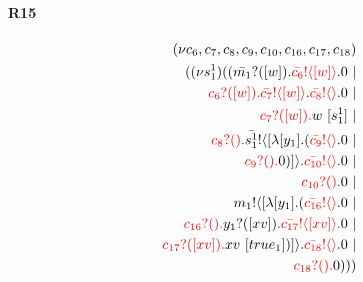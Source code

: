 \documentclass{article}
\begin{document}
\paragraph{R15}
\begin{align*}
 (\nu c_{6},c_{7},c_{8},c_{9},c_{10},c_{16},c_{17},c_{18}) \\ ( (\nu s^{1}_{1})((\color{black}\bar{m_{1}}?([w]).\color{black}\color{red}\bar{c_{6}}! \langle [w] \rangle \color{black}.0  \ | \\ \color{red}c_{6}?([w]).\color{black}\color{red}\bar{c_{7}}! \langle [w] \rangle \color{black}.\color{red}\bar{c_{8}}! \langle  \rangle \color{black}.0  \ | \\ \color{red}c_{7}?([w]).\color{black}w \ [s^{1}_{1}] \ | \\ \color{red}c_{8}?().\color{black}\color{black}\bar{s^{1}_{1}}! \langle [ \lambda [y_{1}].(\color{red}\bar{c_{9}}! \langle  \rangle \color{black}.0  \ | \\ \color{red}c_{9}?().\color{black}0 )] \rangle \color{black}.\color{red}\bar{c_{10}}! \langle  \rangle \color{black}.0  \ | \\ \color{red}c_{10}?().\color{black}0  \ | \\ \color{black}m_{1}! \langle [ \lambda [y_{1}].(\color{red}\bar{c_{16}}! \langle  \rangle \color{black}.0  \ | \\ \color{red}c_{16}?().\color{black}\color{black}y_{1}?([xv]).\color{black}\color{red}\bar{c_{17}}! \langle [xv] \rangle \color{black}.0  \ | \\ \color{red}c_{17}?([xv]).\color{black}xv \ [true_{1}])] \rangle \color{black}.\color{red}\bar{c_{18}}! \langle  \rangle \color{black}.0  \ | \\ \color{red}c_{18}?().\color{black}0 )))
\end{align*}
\end{document}
